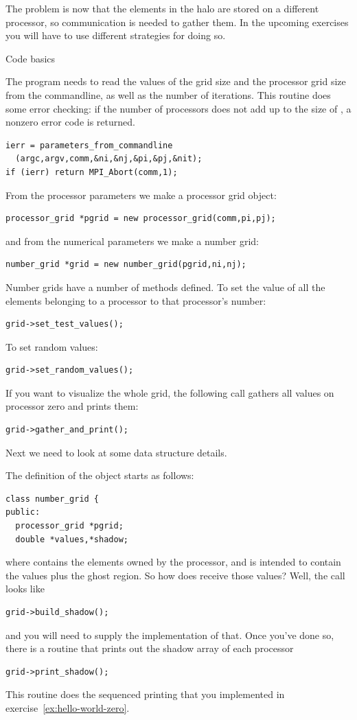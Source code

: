 The problem is now that the elements in the halo are stored on a
different processor, so communication is needed to gather them. In the
upcoming exercises you will have to use different strategies for doing
so.

 {Code basics}

The program needs to read the values of the grid size and the
processor grid size from the commandline, as well as the number of
iterations. This routine does some error checking: if the number of
processors does not add up to the size of , a
nonzero error code is returned.
\begin{verbatim}
ierr = parameters_from_commandline
  (argc,argv,comm,&ni,&nj,&pi,&pj,&nit);
if (ierr) return MPI_Abort(comm,1);
\end{verbatim}
From the processor parameters we make a processor grid object:
\begin{verbatim}
processor_grid *pgrid = new processor_grid(comm,pi,pj);
\end{verbatim}
and from the numerical parameters we make a number grid:
\begin{verbatim}
number_grid *grid = new number_grid(pgrid,ni,nj);
\end{verbatim}
Number grids have a number of methods defined. To set the value of all
the elements belonging to a processor to that processor's number:
\begin{verbatim}
grid->set_test_values();
\end{verbatim}
To set random values:
\begin{verbatim}
grid->set_random_values();
\end{verbatim}
If you want to visualize the whole grid, the following call gathers
all values on processor zero and prints them:
\begin{verbatim}
grid->gather_and_print();
\end{verbatim}

Next we need to look at some data structure details.

The definition of the  object starts as follows:
\begin{verbatim}
class number_grid {
public:
  processor_grid *pgrid;
  double *values,*shadow;
\end{verbatim}
where  contains the elements owned by the processor,
and  is intended to contain the values plus the ghost
region. So how does  receive those values? Well, the call looks 
like
\begin{verbatim}
grid->build_shadow();
\end{verbatim}
and you will need to supply the implementation of that.
Once you've done so, there is a routine that prints out the shadow array 
of each processor
\begin{verbatim}
grid->print_shadow();
\end{verbatim}
This routine does the sequenced printing that you implemented in
exercise~\ref{ex:hello-world-zero}.


